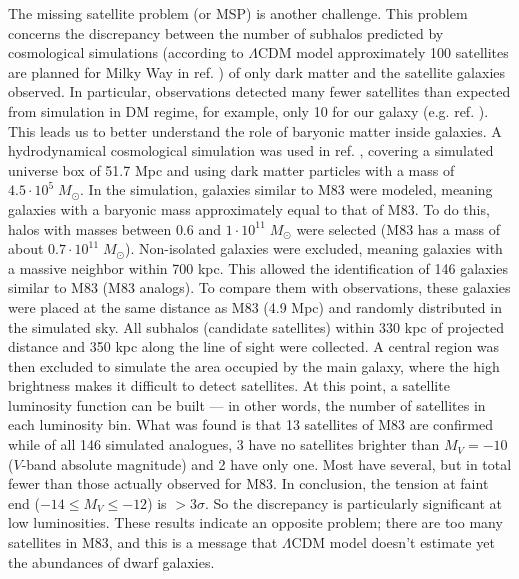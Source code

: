 The missing satellite problem (or MSP) is another challenge. This problem concerns the discrepancy between the number of subhalos predicted by cosmological simulations (according to $\Lambda$CDM model approximately 100 satellites are planned for Milky Way in ref. \cite{There_is_No_Missing_Satellites_Problem}) of only dark matter and the satellite galaxies observed. In particular, observations detected many fewer satellites than expected from simulation in DM regime, for example, only 10 for our galaxy (e.g. ref. \cite{There_is_No_Missing_Satellites_Problem}). This leads us to better understand the role of baryonic matter inside galaxies.
A hydrodynamical cosmological simulation was used in ref. \cite{too-many-dwarf-galaxy-satellites-problem}, covering a simulated universe box of 51.7 Mpc and using dark matter particles with a mass of $4.5 \cdot 10^5 \; M_\odot$. In the simulation, galaxies similar to M83 were modeled, meaning galaxies with a baryonic mass approximately equal to that of M83. To do this, halos with masses between $0.6$ and $1 \cdot 10^{11} \; M_\odot$ were selected (M83 has a mass of about $0.7 \cdot 10^{11} \; M_\odot$). Non-isolated galaxies were excluded, meaning galaxies with a massive neighbor within 700 kpc. This allowed the identification of 146 galaxies similar to M83 (M83 analogs).
To compare them with observations, these galaxies were placed at the same distance as M83 (4.9 Mpc) and randomly distributed in the simulated sky. All subhalos (candidate satellites) within 330 kpc of projected distance and 350 kpc along the line of sight were collected. A central region was then excluded to simulate the area occupied by the main galaxy, where the high brightness makes it difficult to detect satellites. At this point, a satellite luminosity function can be built — in other words, the number of satellites in each luminosity bin.
What was found is that 13 satellites of M83 are confirmed while of all 146 simulated analogues, 3 have no satellites brighter than $M_V = -10$ ($V$-band absolute magnitude) and 2 have only one. Most have several, but in total fewer than those actually observed for M83. In conclusion, the tension at faint end ($-14 \leq M_V \leq -12$) is $> 3\sigma$. So the discrepancy is particularly significant at low luminosities.
These results indicate an opposite problem; there are too many satellites in M83, and this is a message that $\Lambda$CDM model doesn't estimate yet the abundances of dwarf galaxies.\\

